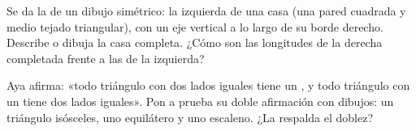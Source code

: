 \begin{exercise}[$\star\star$]\label{exo:g4:symmetry:10}
Se da la  de un dibujo simétrico: la  izquierda de una casa
(una pared cuadrada y medio tejado triangular), con un eje vertical
a lo largo de su borde derecho. Describe o dibuja la casa completa. ¿Cómo son
las longitudes de la  derecha completada frente a las de la izquierda?
\end{exercise}

\begin{exercise}[$\star\star$]\label{exo:g4:symmetry:11}
Aya afirma: «todo triángulo con dos lados iguales tiene un , y todo triángulo con un  tiene dos lados
iguales». Pon a prueba su doble afirmación con dibujos: un triángulo isósceles,
uno equilátero y uno escaleno. ¿La respalda el doblez?
\end{exercise}
